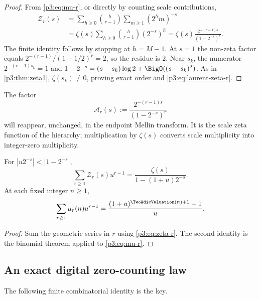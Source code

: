 \documentclass[11pt,oneside]{article}
\theoremstyle{definition}
\theoremstyle{remark}
\begin{document}
\begin{proof}
From \eqref{p3:eq:mu-r}, or directly by counting scale contributions,
\begin{align*}
 \mathcal Z_r(s)
 &=\sum_{h\ge0}\binom h{r-1}\sum_{m\ge1}(2^hm)^{-s}\\
 &=\zeta(s)\sum_{h\ge0}\binom h{r-1}(2^{-s})^h
 =\zeta(s)\frac{2^{-(r-1)s}}{(1-2^{-s})^r}.
\end{align*}
The finite identity follows by stopping at $h=M-1$.  At $s=1$ the non-zeta factor equals
$2^{-(r-1)}/(1-1/2)^r=2$, so the residue is $2$.  Near $s_k$, the numerator $2^{-(r-1)s_k}=1$ and
$1-2^{-s}=(s-s_k)\log2+\BigO((s-s_k)^2)$.  As in \cref{p3:thm:zeta1}, $\zeta(s_k)\ne0$, proving exact order and \eqref{p3:eq:laurent-zeta-r}.
\end{proof}

The factor
\begin{equation}\label{p3:eq:scale-zeta}
  \mathcal A_r(s):=\frac{2^{-(r-1)s}}{(1-2^{-s})^r}
\end{equation}
will reappear, unchanged, in the endpoint Mellin transform.  It is the scale zeta function of the hierarchy; multiplication by $\zeta(s)$ converts scale multiplicity into integer-zero multiplicity.

\begin{corollary}\label{p3:cor:rank-resolvent}
For $|u2^{-s}|<|1-2^{-s}|$,
\begin{equation}\label{p3:eq:rank-resolvent}
 \sum_{r\ge1}\mathcal Z_r(s)u^{r-1}
 =\frac{\zeta(s)}{1-(1+u)2^{-s}}.
\end{equation}
At each fixed integer $n\ge1$,
\begin{equation}\label{p3:eq:mu-rank-gen}
 \sum_{r\ge1}\mu_r(n)u^{r-1}
 =\frac{(1+u)^{\TwoAdicValuation(n)+1}-1}{u}.
\end{equation}
\end{corollary}

\begin{proof}
Sum the geometric series in $r$ using \eqref{p3:eq:zeta-r}.  The second identity is the binomial theorem applied to \eqref{p3:eq:mu-r}.
\end{proof}

\subsection{An exact digital zero-counting law}

The following finite combinatorial identity is the key.
\end{document}
